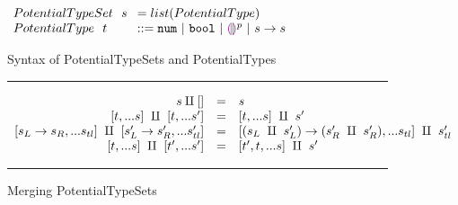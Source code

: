 \begin{figure}[h!]
\centering
\vspace{-3px} 
$\arraycolsep=4pt\begin{array}{lll}
PotentialTypeSet~~ s & = list(PotentialType)
\\
PotentialType~~ t & ::= 
  \tnum ~\vert~
  \tbool ~\vert~
  \ehole^p ~\vert~
  \tarr{s}{s}
  \\
\end{array}$
\label{fig:syntax_possible_type_sets}
\caption{Syntax of PotentialTypeSets and PotentialTypes}
\vspace{5px}
\hrule
\[\begin{array}{rcl}
    s \amalg [] & = & s \\
    \left[t,...s\right] ~\amalg~ \left[t,...s'\right] & = & \left[t,...s\right] ~\amalg~ s' \\
    \left[s_L \rightarrow s_R,...s_{tl}\right] ~\amalg~ \left[s'_L \rightarrow s'_R,...s'_{tl}\right] & = & \left[(s_L ~\amalg~ s'_L) \rightarrow (s'_R ~\amalg~ s'_R),...s_{tl}\right] ~\amalg~ s'_{tl} \\
    \left[t,...s\right] ~\amalg~ \left[t',...s'\right] & = & \left[t',t,...s\right] ~\amalg~ s' \\
    
\end{array}\] 
\caption{Merging PotentialTypeSets}
\vspace{5px} 
\hrule
\label{fig:possible_type_sets}
\vspace{-5px}
\end{figure}

